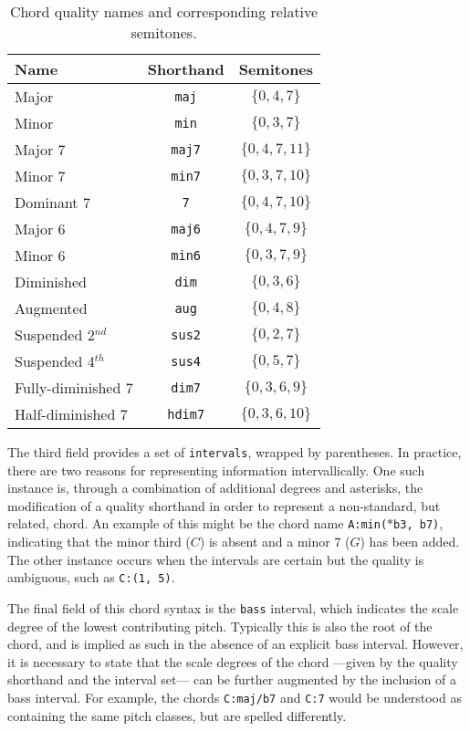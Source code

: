 \begin{table}[t]
\begin{center}
\caption{Chord quality names and corresponding relative semitones.}
\label{tab:qualities}
\begin{tabular}{l | c | c}
Name & Shorthand & Semitones \\
\hline
Major & \texttt{maj} & $\{0, 4, 7\}$ \\
Minor & \texttt{min} & $\{0, 3, 7\}$ \\
Major 7 & \texttt{maj7} & $\{0, 4, 7, 11\}$ \\
Minor 7 & \texttt{min7} & $\{0, 3, 7, 10\}$ \\
Dominant 7 & \texttt{7} & $\{0, 4, 7, 10\}$ \\
Major 6 & \texttt{maj6} & $\{0, 4, 7, 9\}$ \\
Minor 6 & \texttt{min6} & $\{0, 3, 7, 9\}$ \\
Diminished & \texttt{dim} & $\{0, 3, 6\}$ \\
Augmented & \texttt{aug} & $\{0, 4, 8\}$ \\
Suspended 2$^{nd}$ & \texttt{sus2} & $\{0, 2, 7\}$ \\
Suspended 4$^{th}$ & \texttt{sus4} & $\{0, 5, 7\}$ \\
Fully-diminished 7 & \texttt{dim7} & $\{0, 3, 6, 9\}$ \\
Half-diminished 7 & \texttt{hdim7} & $\{0, 3, 6, 10\}$ \\
\hline
\end{tabular}
\end{center}
\end{table}


The third field provides a set of \texttt{intervals}, wrapped by parentheses.
In practice, there are two reasons for representing information intervallically.
One such instance is, through a combination of additional degrees and asterisks, the modification of a quality shorthand in order to represent a non-standard, but related, chord.
An example of this might be the chord name \texttt{A:min($\ast$b3, b7)}, indicating that the minor third ($C$) is absent and a minor 7 ($G$) has been added.
The other instance occurs when the intervals are certain but the quality is ambiguous, such as \texttt{C:(1, 5)}. %

The final field of this chord syntax is the \texttt{bass} interval, which indicates the scale degree of the lowest contributing pitch.
Typically this is also the root of the chord, and is implied as such in the absence of an explicit bass interval.
However, it is necessary to state that the scale degrees of the chord ---given by the quality shorthand and the interval set--- can be further augmented by the inclusion of a bass interval.
For example, the chords \texttt{C:maj/b7} and \texttt{C:7} would be understood as containing the same pitch classes, but are spelled differently.


